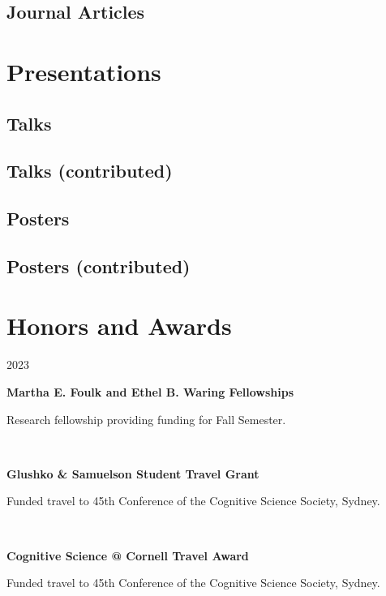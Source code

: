 \documentclass{article}
\newcommand{\awardentry}[3]{
  \begin{minipage}[t]{.15\textwidth}
    \begin{flushright}
      \hfill {#1}
    \end{flushright}
  \end{minipage}
  \hfill\vline\hfill
  \begin{minipage}[t]{.80\textwidth}
    \textbf{#2}

    \footnotesize{#3}
  \end{minipage}\\\vspace{.25cm}
}
\begin{document}
\subsection{Journal Articles}
\nocite{*}
\printbibliography[heading=none]



\section{Presentations}

\subsection{Talks}
\nocite{*}
\printbibliography[heading=none]

\subsection{Talks (contributed)}
\nocite{*}
\printbibliography[heading=none]

\subsection{Posters}
\nocite{*}
\printbibliography[heading=none]

\subsection{Posters (contributed)}
\nocite{*}
\printbibliography[heading=none]


\section{Honors and Awards}

\awardentry{2023}{Martha E. Foulk and Ethel B. Waring Fellowships}
{Research fellowship providing funding for Fall Semester.}

\awardentry{}{Glushko \& Samuelson Student Travel Grant}
{Funded travel to 45th Conference of the Cognitive Science Society, Sydney.}

\awardentry{}{Cognitive Science @ Cornell Travel Award}
{Funded travel to 45th Conference of the Cognitive Science Society, Sydney.}
\end{document}

